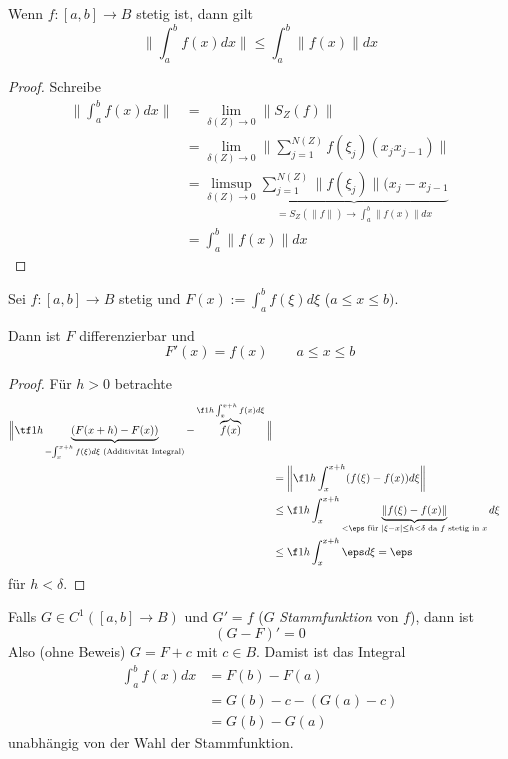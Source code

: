 \begin{st} \label{3.4}
	Wenn $f:[a,b] \to B$ stetig ist, dann gilt
	\[
		\bigg\| \int_a^b f(x) dx \bigg\| \le \int_a^b \|f(x)\| dx
	\]
	\begin{proof}
		Schreibe
		\begin{align*}
			\bigg\|\int_a^b f(x) dx \bigg\| 
			&= \lim_{\delta(Z)\to 0} \|S_Z(f)\| \\
			&= \lim_{\delta(Z)\to 0} \bigg\| \sum_{j=1}^{N(Z)} f(\xi_j) (x_{j} x_{j-1}) \bigg\| \\
			&= \limsup_{\delta(Z) \to 0} \underbrace{\sum_{j=1}^{N(Z)} \| f(\xi_j) \| (x_j - x_{j-1}}_{= S_Z(\|f\|) \to \int_a^b \|f(x)\| dx} \\
			&= \int_a^b \|f(x)\| dx
		\end{align*}
	\end{proof}
\end{st}

\begin{st}[Hauptsatz] \label{3.5}
	Sei $f: [a,b] \to B$ stetig und $F(x) := \int_a^b f(\xi) d\xi$ ($a \le x \le b)$.

	Dann ist $F$ differenzierbar und 
	\[
		F'(x) = f(x) 
		\qquad a \le x \le b
	\]
	\begin{proof}
		Für $h > 0$ betrachte
		\begin{align*}
			\Big\| \tf 1h \underbrace{(F(x+h) - F(x))}_{= \int_x^{x+h}f(\xi) d\xi \text{ (Additivität Integral)}} - \overbrace{f(x)}^{\f 1h \int_{x}^{x+h}f(x) d\xi} \Big\| \\
			&= \bigg\| \f 1h \int_x^{x+h} (f(\xi) - f(x)) d\xi \bigg\|  \\
			&\le \f 1h \int_x^{x+h} \underbrace{\|f(\xi) - f(x)\|}_{< \eps \text{ für } |\xi - x| \le h < \delta \text{ da $f$ stetig in $x$}} d\xi \\
			&\le \f 1h \int_x^{x+h} \eps d\xi = \eps
		\end{align*}
		für $h < \delta$.
	\end{proof}
\end{st}

\begin{kor}[Folgerung] \label{3.6}
	Falls $G \in C^1([a,b] \to B)$ und $G' = f$ ($G$ \emph{Stammfunktion} von $f$), dann ist
	\[
		(G - F)' = 0
	\]
	Also (ohne Beweis) $G = F + c$ mit $c \in B$.
	Damist ist das Integral
	\begin{align*}
		\int_a^b f(x) dx 
		&= F(b) - F(a) \\
		&= G(b) - c - (G(a) - c) \\
		&= G(b) - G(a)
	\end{align*}
	unabhängig von der Wahl der Stammfunktion.
\end{kor}

